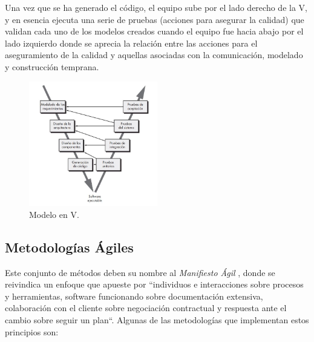 \begin{itemize}
        Una vez que se ha generado el código, el equipo sube por el lado derecho de la V, y en esencia ejecuta una serie de pruebas (acciones para asegurar la calidad) que validan cada uno de los modelos creados cuando el equipo fue hacia abajo por el lado izquierdo donde se aprecia la relación entre las acciones para  el aseguramiento de la calidad y aquellas asociadas con la comunicación, modelado y construcción temprana. 
    
        \begin{figure}[h]
            \centering
            \includegraphics[width=0.5\textwidth]{figures/en v.JPG}
            \caption[Modelo en V, extraído de \cite{pressman_software_2005}]{Modelo en V.}
            \label{fig:metodologia:modelo_v}
        \end{figure}
    \end{itemize}

    \subsection{Metodologías Ágiles}

    Este conjunto de métodos deben su nombre al \textit{Manifiesto Ágil} \cite{varios_autores_manifiesto_2001}, donde se reivindica un enfoque que apueste por ``individuos e interacciones sobre procesos y herramientas, software funcionando sobre documentación extensiva, colaboración con el cliente sobre negociación contractual y respuesta ante el cambio sobre seguir un plan``. Algunas de las metodologías que implementan estos principios son:

